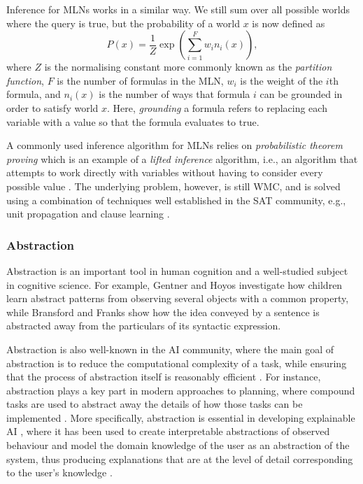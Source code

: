 \documentclass{article}
\begin{document}
Inference for MLNs works in a similar way. We still sum over all possible
worlds where the query is true, but the probability of a world $x$ is now
defined as
\[
  P(x) = \frac{1}{Z} \exp \left( \sum_{i=1}^F w_i n_i(x) \right),
\]
where $Z$ is the normalising constant more commonly known as the \emph{partition
function}, $F$ is the number of formulas in the MLN, $w_i$ is the weight of the
$i$th formula, and $n_i(x)$ is the number of ways that formula $i$ can be
grounded in order to satisfy world $x$. Here, \emph{grounding} a formula refers
to replacing each variable with a value so that the formula evaluates to true.

A commonly used inference algorithm for MLNs relies on \emph{probabilistic
  theorem proving}
\cite{DBLP:journals/cacm/GogateD16,DBLP:journals/cib/Venugopal17}
which is an example of a \emph{lifted inference} algorithm, i.e., an algorithm
that attempts to work directly with variables without having to consider every
possible value \cite{DBLP:conf/ijcai/Poole03}. The underlying problem, however,
is still WMC, and is solved using a combination of techniques well established
in the SAT community, e.g., unit propagation and clause learning
\cite{DBLP:journals/cib/Venugopal17}.

\subsubsection{Abstraction}

Abstraction is an important tool in human cognition and a well-studied subject
in cognitive science. For example, Gentner and Hoyos \cite{Gentner2017-GENAAA-2}
investigate how children learn abstract patterns from observing several
objects with a common property, while Bransford and Franks
\cite{BRANSFORD1971331} show how the idea conveyed by a sentence is abstracted
away from the particulars of its syntactic expression.

Abstraction is also well-known in the AI community,
where the main goal of abstraction is to reduce the computational complexity of
a task, while ensuring that the process of abstraction itself is reasonably
efficient \cite{saitta2013abstraction}. For instance, abstraction plays a key
part in modern approaches to planning, where compound tasks are used to abstract
away the details of how those tasks can be implemented
\cite{DBLP:journals/amai/ErolHN96}. More specifically, abstraction is essential
in developing explainable AI \cite{DBLP:journals/access/AdadiB18}, where
it has been used to create interpretable abstractions of observed behaviour
\cite{DBLP:journals/corr/PenkovR17} and model the domain knowledge of the user
as an abstraction of the system, thus producing explanations that are at the
level of detail corresponding to the user's knowledge
\cite{DBLP:conf/ijcai/SreedharanSK18}.
\end{document}
